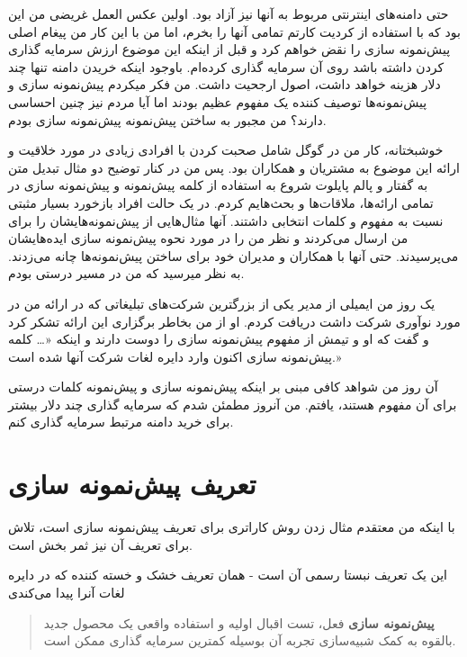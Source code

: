 حتی دامنه‌های اینترنتی مربوط به آنها نیز آزاد بود. اولین عکس العمل غریضی
من این بود که با استفاده از کردیت کارتم تمامی آنها را بخرم، اما من با
این کار من پیغام اصلی پیش‌نمونه سازی را نقض خواهم کرد و قبل از اینکه این
موضوع ارزش سرمایه گذاری کردن داشته باشد روی آن سرمایه گذاری کرده‌ام.
باوجود اینکه خریدن دامنه تنها چند دلار هزینه خواهد داشت، اصول ارجحیت
داشت. من فکر میکردم پیش‌نمونه سازی و پیش‌نمونه‌ها توصیف کننده یک مفهوم
عظیم بودند اما آیا مردم نیز چنین احساسی دارند؟ من مجبور به ساختن
پیش‌نمونه پیش‌نمونه سازی بودم.

خوشبختانه، کار من در گوگل شامل صحبت کردن با افرادی زیادی در مورد خلاقیت
و ارائه این موضوع به مشتریان و همکاران بود. پس من در کنار توضیح دو مثال
تبدیل متن به گفتار و پالم پایلوت شروع به استفاده از کلمه پیش‌نمونه و
پیش‌نمونه سازی در تمامی ارائه‌ها، ملاقات‌ها و بحث‌هایم کردم. در یک حالت
افراد بازخورد بسیار مثبتی نسبت به مفهوم و کلمات انتخابی داشتند. آنها
مثال‌هایی از پیش‌نمونه‌هایشان را برای من ارسال می‌کردند و نظر من را در
مورد نحوه پیش‌نمونه سازی ایده‌هایشان می‌پرسیدند. حتی آنها با همکاران و
مدیران خود برای ساختن پیش‌نمونه‌ها چانه می‌زدند. به نظر میرسید که من در
مسیر درستی بودم.

یک روز من ایمیلی از مدیر یکی از بزرگترین شرکت‌های تبلیغاتی که در ارائه
من در مورد نوآوری شرکت داشت دریافت کردم. او از من بخاطر برگزاری این
ارائه تشکر کرد و گفت که او و تیمش از مفهوم پیش‌نمونه سازی را دوست دارند
و اینکه «\ldots{} کلمه پیش‌نمونه سازی اکنون وارد دایره لغات شرکت آنها
شده است.»

آن روز من شواهد کافی مبنی بر اینکه پیش‌نمونه سازی و پیش‌نمونه کلمات
درستی برای آن مفهوم هستند، یافتم. من آنروز مطمئن شدم که سرمایه گذاری چند
دلار بیشتر برای خرید دامنه مرتبط سرمایه گذاری کنم.

\section{تعریف پیش‌نمونه
سازی}\label{ux62aux639ux631ux6ccux641-ux67eux6ccux634ux646ux645ux648ux646ux647-ux633ux627ux632ux6cc}

با اینکه من معتقدم مثال زدن روش‌ کاراتری برای تعریف پیش‌نمونه سازی است،
تلاش برای تعریف آن نیز ثمر بخش است.

این یک تعریف نبستا رسمی آن است - همان تعریف خشک و خسته کننده که در دایره
لغات آنرا پیدا می‌کندی

\begin{quote}
\textbf{پیش‌نمونه سازی} فعل، تست اقبال اولیه و استفاده واقعی یک محصول
جدید بالقوه به کمک شبیه‌سازی تجربه آن بوسیله کمترین سرمایه گذاری ممکن
است.
\end{quote}

